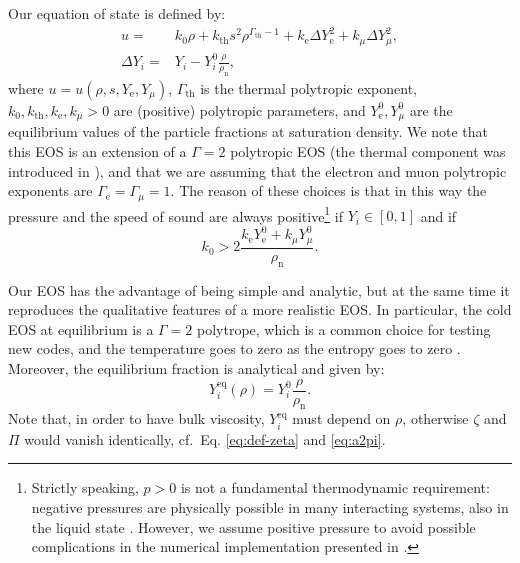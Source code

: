 \documentclass[aps,prd,twocolumn,a4paper,floatfix,nofootbib,superscriptaddress,nofootinbib]{revtex4}
\newcommand{\rth}{\mathrm{th}}
\newcommand{\re}{\mathrm{e}}
\newcommand{\rn}{\mathrm{n}}
\newcommand{\req}{\mathrm{eq}}
\begin{document}
Our equation of state is defined by:
%
\begin{align}
\label{eq:eos}
%
u={}& k_0\rho+ k_\rth s^2\rho^{\Gamma_\rth-1}
+ k_\re\Delta Y_\re^2 + k_\mu\Delta Y_\mu^2,\\
\Delta Y_i={}&{}Y_i - Y_i^0 \frac{\rho}{\rho_\rn},
\end{align}
%
where $u=u(\rho,s,Y_\re,Y_\mu)$,
$\Gamma_\rth$ is the thermal polytropic exponent, $k_0,k_\rth,k_\re,k_\mu>0$
are (positive) polytropic parameters, and $Y_\re^0,Y_\mu^0$ are the equilibrium values
of the particle fractions at saturation density.
We note that this EOS is an extension of a $\Gamma=2$ polytropic EOS (the
thermal component was introduced in \citet{Camelio19}), and that we are
assuming that the electron and muon polytropic exponents are $\Gamma_\re=\Gamma_\mu=1$.
The reason of these choices is that in this way the pressure and the speed of
sound are always positive\footnote{Strictly speaking, $p>0$ is not a
fundamental thermodynamic requirement: negative pressures are physically
possible in many interacting systems, also in the liquid state
\citep{Imre1998}.  However, we assume positive pressure to avoid possible
complications in the numerical implementation \cite{Camelio22code} presented in
\citet{Camelio22b}.} 
if $Y_i\in[0,1]$ and if
%
\begin{equation}
k_0>2\frac{{k_\re Y_\re^0 + k_\mu Y_\mu^0}}{\rho_\rn}.
\end{equation}

Our EOS has the advantage of being simple and analytic, but at the
same time it reproduces the qualitative features of a more realistic EOS. 
In particular, the cold EOS at equilibrium is a $\Gamma=2$ polytrope, which is a
common choice for testing new codes, and the temperature
goes to zero as the entropy goes to zero \cite{landau6}.
Moreover, the equilibrium fraction is analytical and given by:
%
\begin{equation}
Y^\req_i(\rho)=Y^0_i\frac{\rho}{\rho_\rn}.
\end{equation}
Note that, in order to have bulk viscosity,
$Y^\req_i$ must depend on $\rho$, otherwise $\zeta$ and $\Pi$ would vanish
identically, cf.~Eq. \eqref{eq:def-zeta} and \eqref{eq:a2pi}.
\end{document}
